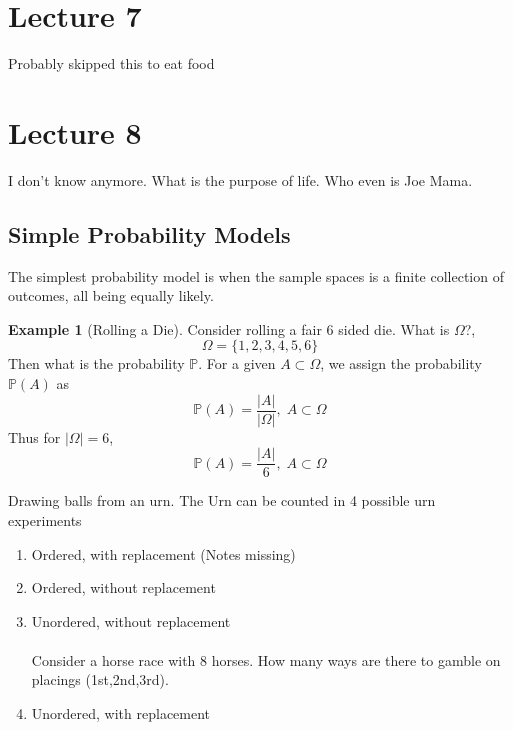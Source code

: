 \documentclass{report}
\theoremstyle{definition}
\newtheorem{example}{Example}
\theoremstyle{plain}
\newtheorem{theorem}{Theorem}
\theoremstyle{remark}
\begin{document}
\section{Lecture 7}
Probably skipped this to eat food
\section{Lecture 8}
I don't know anymore. What is the purpose of life. Who even is Joe Mama.
\subsection{Simple Probability Models}
The simplest probability model is when the sample spaces is a finite collection
of outcomes, all being equally likely.
\begin{example}[Rolling a Die]
  Consider rolling a fair 6 sided die. What is $ \Omega $?,
  $$ \Omega = \{1,2,3,4,5,6\} $$
  Then what is the probability $ \mathbb{P} $. For a given $ A \subset \Omega
  $, we assign the probability $ \mathbb{P}(A) $ as 
  $$ \mathbb{P}(A) = \frac{|A|}{|\Omega|}, \; A \subset \Omega $$
  Thus for $ |\Omega| = 6 $,
  $$ \mathbb{P}(A) = \frac{|A|}{6}, \; A \subset \Omega $$
\end{example}
Drawing balls from an urn. The Urn can be counted in 4 possible urn experiments
\begin{enumerate}
  \item Ordered, with replacement
    (Notes missing)
  \item Ordered, without replacement  
  \item Unordered, without replacement \\\\
    Consider a horse race with 8 horses. How many ways are there to gamble on
    placings (1st,2nd,3rd).

  \item Unordered, with replacement
\end{enumerate}
\begin{center}
\end{center}
\end{document}
